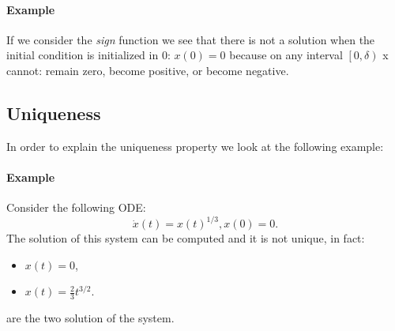 \paragraph{Example} If we consider the \emph{sign} function we see that there is not a solution when the initial condition is initialized in 0: $x(0)=0$ because on any interval $\left[0,\delta\right)$ x cannot: remain zero, become positive, or become negative.

\begin{center}
\end{center}

\subsection{Uniqueness}
In order to explain the uniqueness property we look at the following example:
\paragraph{Example} Consider the following ODE: 
\[
\dot{x}(t)=x(t)^{1/3}, x(0)=0.
\]
The solution of this system can be computed and it is not unique, in fact:
\begin{itemize}
	\item $x(t)=0$,
	\item $x(t)=\frac{2}{3}t^{3/2}.$
\end{itemize}
are the two solution of the system.


\begin{center}
\end{center}

